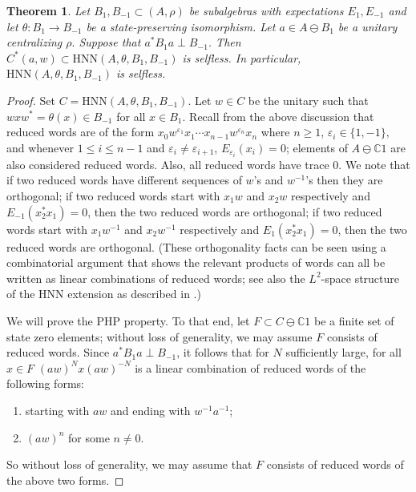 \documentclass{amsart}
\newtheorem{theorem}{Theorem}[section]
\theoremstyle{definition}
\newcommand{\C}{\mathbb{C}}
\newcommand{\ee}{\varepsilon}
\begin{document}
\begin{theorem}
    Let $B_1,B_{-1}\subset (A,\rho)$ be subalgebras with expectations $E_1,E_{-1}$ and let $\theta:B_1\to B_{-1}$ be a state-preserving isomorphism. Let $a\in A\ominus B_1$ be a unitary centralizing $\rho.$ Suppose that $a^*B_1a\perp B_{-1}$. Then $C^\ast(a, w) \subset \mathrm{HNN}(A,\theta,B_1,B_{-1})$ is selfless. In particular, $\mathrm{HNN}(A,\theta,B_1,B_{-1})$ is selfless.
\end{theorem}

\begin{proof}
    Set $C = \mathrm{HNN}(A,\theta,B_1,B_{-1})$. Let $w \in C$ be the unitary such that $wxw^* = \theta(x)\in B_{-1}$ for all $x\in B_1.$ Recall from the above discussion that reduced words are of the form $x_0w^{\ee_1}x_1 \cdots x_{n-1}w^{\ee_{n}}x_n$ where $n\geq 1$, $\ee_i\in\{1,-1\},$ and whenever $1\leq i\leq n-1$ and $\ee_i\neq \ee_{i+1}$, $E_{\ee_i}(x_i)=0$; elements of $A\ominus \C1$ are also considered reduced words. Also, all reduced words have trace 0. We note that if two reduced words have different sequences of $w$'s and $w^{-1}$'s then they are orthogonal; if two reduced words start with $x_1w$ and $x_2w$ respectively and $E_{-1}(x_2^*x_1)=0$, then the two reduced words are orthogonal; if two reduced words start with $x_1w^{-1}$ and $x_2w^{-1}$ respectively and $E_{1}(x_2^*x_1)=0$, then the two reduced words are orthogonal. (These orthogonality facts can be seen using a combinatorial argument that shows the relevant products of words can all be written as linear combinations of reduced words; see also the $L^2$-space structure of the HNN extension as described in \cite[Section~3]{fima2012hnn}.)

    We will prove the PHP property. To that end, let $F\subset C\ominus \C1$ be a finite set of state zero elements; without loss of generality, we may assume $F$ consists of reduced words. Since $a^*B_1a\perp B_{-1}$, it follows that for $N$ sufficiently large, for all $x\in F$ $(aw)^Nx(aw)^{-N}$ is a linear combination of reduced words of the following forms:
    \begin{enumerate}
        \item starting with $aw$ and ending with $w^{-1}a^{-1}$;
        \item $(aw)^n$ for some $n\neq 0.$
    \end{enumerate}
    So without loss of generality, we may assume that $F$ consists of reduced words of the above two forms.


\end{proof}
\end{document}
